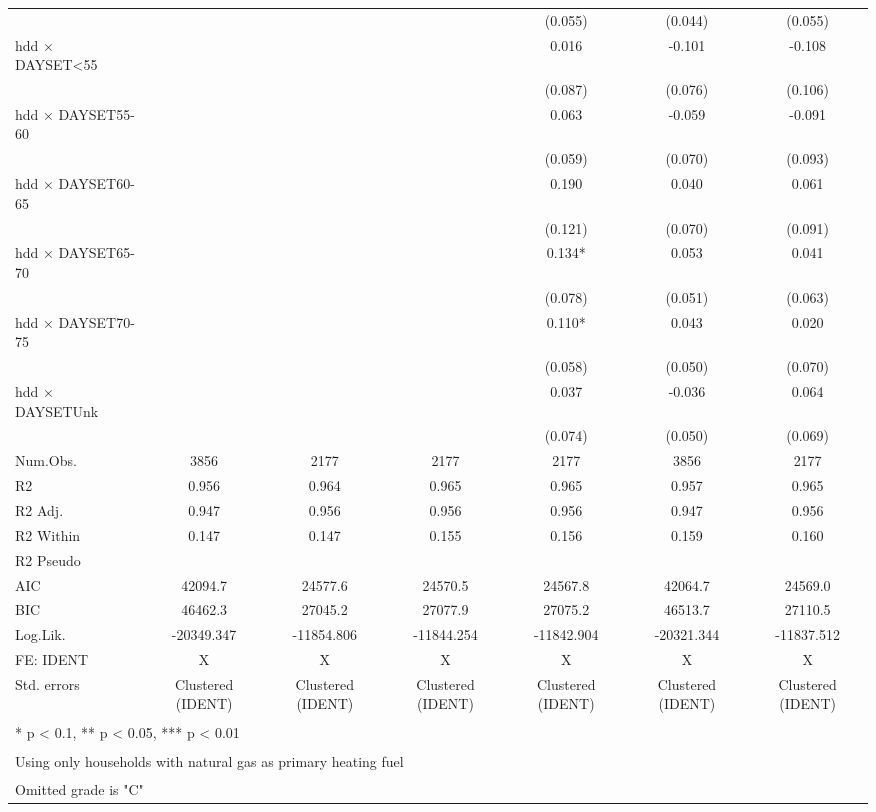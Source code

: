 \documentclass[
]{article}
\begin{document}
\begin{table}
{\begin{tabular}[t]{lcccccc}
 &  &  &  & (0.055) & (0.044) & (0.055)\\
hdd × DAYSET<55 &  &  &  & 0.016 & -0.101 & -0.108\\
 &  &  &  & (0.087) & (0.076) & (0.106)\\
hdd × DAYSET55-60 &  &  &  & 0.063 & -0.059 & -0.091\\
 &  &  &  & (0.059) & (0.070) & (0.093)\\
hdd × DAYSET60-65 &  &  &  & 0.190 & 0.040 & 0.061\\
 &  &  &  & (0.121) & (0.070) & (0.091)\\
hdd × DAYSET65-70 &  &  &  & 0.134* & 0.053 & 0.041\\
 &  &  &  & (0.078) & (0.051) & (0.063)\\
hdd × DAYSET70-75 &  &  &  & 0.110* & 0.043 & 0.020\\
 &  &  &  & (0.058) & (0.050) & (0.070)\\
hdd × DAYSETUnk &  &  &  & 0.037 & -0.036 & 0.064\\
 &  &  &  & (0.074) & (0.050) & (0.069)\\
\midrule
Num.Obs. & 3856 & 2177 & 2177 & 2177 & 3856 & 2177\\
R2 & 0.956 & 0.964 & 0.965 & 0.965 & 0.957 & 0.965\\
R2 Adj. & 0.947 & 0.956 & 0.956 & 0.956 & 0.947 & 0.956\\
R2 Within & 0.147 & 0.147 & 0.155 & 0.156 & 0.159 & 0.160\\
R2 Pseudo &  &  &  &  &  & \\
AIC & 42094.7 & 24577.6 & 24570.5 & 24567.8 & 42064.7 & 24569.0\\
BIC & 46462.3 & 27045.2 & 27077.9 & 27075.2 & 46513.7 & 27110.5\\
Log.Lik. & -20349.347 & -11854.806 & -11844.254 & -11842.904 & -20321.344 & -11837.512\\
FE: IDENT & X & X & X & X & X & X\\
Std. errors & Clustered (IDENT) & Clustered (IDENT) & Clustered (IDENT) & Clustered (IDENT) & Clustered (IDENT) & Clustered (IDENT)\\
\bottomrule
\multicolumn{7}{l}{\textsuperscript{} * p < 0.1, ** p < 0.05, *** p < 0.01}\\
\multicolumn{7}{l}{\textsuperscript{} Using only households with natural gas as primary heating fuel}\\
\multicolumn{7}{l}{\textsuperscript{} Omitted grade is "C"}\\
\end{tabular}}
\end{table}
\end{document}
